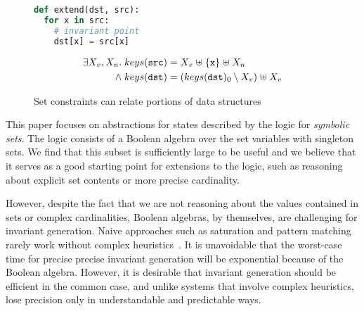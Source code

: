 \begin{figure}[tb]
  \newbox\exprogbox
  \begin{lrbox}{\exprogbox}
    \begin{minipage}[t][1cm][b]{0.4\textwidth}
      \begin{lstlisting}[language=python]
def extend(dst, src):
  for x in src:
    # invariant point
    dst[x] = src[x]
      \end{lstlisting}
    \end{minipage}
  \end{lrbox}
  \newbox\exproginv
  \begin{lrbox}{\exproginv}
    \begin{minipage}[t][0.9cm][b]{0.4\textwidth}
      \begin{align*}
        \exists X_v, X_n. \; keys(\texttt{src})
        & = X_v \mathrel{\uplus} \{\texttt{x}\} \mathrel{\uplus} X_n
        \\
        {} \mathrel{\wedge} keys(\texttt{dst})
        & = (keys(\texttt{dst})_0 \setminus X_v) \mathrel{\uplus} X_v
      \end{align*}
    \end{minipage}
  \end{lrbox}
  \centering
  \quad
  \caption{Set constraints can relate portions of data structures}
  \label{fig:intro-example}
\end{figure}

This paper focuses on abstractions for states described by the logic for \emph{symbolic sets}.  The logic consists of a Boolean algebra over the set variables with singleton sets. We find that this subset is sufficiently large to be useful and we
believe that it serves as a good starting point for extensions to the
logic, such as reasoning about explicit set contents or more precise
cardinality.

However, despite the fact that we are not reasoning about the values contained in sets or complex cardinalities, Boolean algebras, by themselves, are challenging for invariant generation.  Naive approaches such as saturation and pattern matching rarely work without complex heuristics~\cite{fixbag:cav:11,ab:ecoop:13}.  It is unavoidable that the worst-case time for precise precise invariant generation will be exponential because of the Boolean algebra. However, it is desirable that invariant generation should be efficient in the common case, and unlike systems that involve complex heuristics, lose precision only in understandable and predictable ways.

